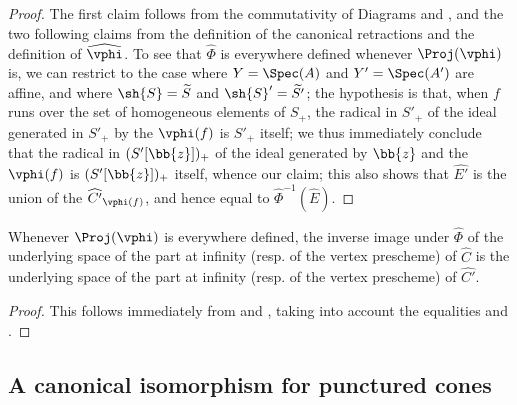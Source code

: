 \begin{proof}
The first claim follows from the commutativity of Diagrams  and , and the two following claims from the definition of the canonical retractions  and the definition of $\widehat{\vphi}$.
To see that $\widehat{\Phi}$ is everywhere defined whenever $\Proj(\vphi)$ is, we can restrict to the case where $Y=\Spec(A)$ and $Y'=\Spec(A')$ are affine, and where $\sh{S}=\widetilde{S}$ and $\sh{S}'=\widetilde{S'}$;
the hypothesis is that, when $f$ runs over the set of homogeneous elements of $S_+$, the radical in $S'_+$ of the ideal generated in $S'_+$ by the $\vphi(f)$ is $S'_+$ itself;
we thus immediately conclude that the radical in $(S'[\bb{z}])_+$ of the ideal generated by $\bb{z}$ and the $\vphi(f)$ is $(S'[\bb{z}])_+$ itself, whence our claim;
this also shows that $\widehat{E'}$ is the union of the $\widehat{C'}_{\vphi(f)}$, and hence equal to $\widehat{\Phi}^{-1}(\widehat{E})$.
\end{proof}

\begin{corollary}[8.5.5]
\label{II.8.5.5}
Whenever $\Proj(\vphi)$ is everywhere defined, the inverse image under $\widehat{\Phi}$ of the underlying space of the part at infinity (resp. of the vertex prescheme) of $\widehat{C}$ is the underlying space of the part at infinity (resp. of the vertex prescheme) of $\widehat{C'}$.
\end{corollary}

\begin{proof}
This follows immediately from  and , taking into account the equalities  and .
\end{proof}


\subsection{A canonical isomorphism for punctured cones}
\label{subsection:II.8.6}

